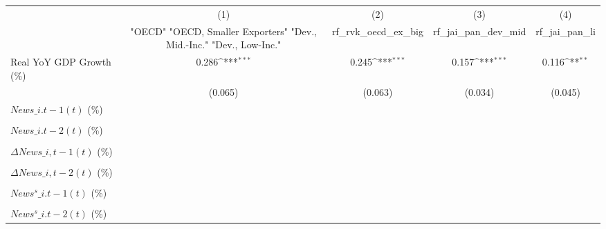 {
\def\sym#1{\ifmmode^{#1}\else\(^{#1}\)\fi}
\begin{tabular}{l*{4}{c}}
\toprule
                    &\multicolumn{1}{c}{(1)}&\multicolumn{1}{c}{(2)}&\multicolumn{1}{c}{(3)}&\multicolumn{1}{c}{(4)}\\
                    &\multicolumn{1}{c}{ "OECD" "OECD, Smaller Exporters" "Dev., Mid.-Inc." "Dev., Low-Inc."}&\multicolumn{1}{c}{rf\_rvk\_oecd\_ex\_big}&\multicolumn{1}{c}{rf\_jai\_pan\_dev\_mid}&\multicolumn{1}{c}{rf\_jai\_pan\_li}\\
\midrule
Real YoY GDP Growth (\%)&       0.286\sym{***}&       0.245\sym{***}&       0.157\sym{***}&       0.116\sym{**} \\
                    &     (0.065)         &     (0.063)         &     (0.034)         &     (0.045)         \\
\addlinespace
$ News\_{i.t-1}(t)$ (\%)&                     &                     &                     &                     \\
                    &                     &                     &                     &                     \\
\addlinespace
$ News\_{i.t-2}(t)$ (\%)&                     &                     &                     &                     \\
                    &                     &                     &                     &                     \\
\addlinespace
$ \Delta News\_{i,t-1}(t)$ (\%)&                     &                     &                     &                     \\
                    &                     &                     &                     &                     \\
\addlinespace
$ \Delta News\_{i,t-2}(t)$ (\%)&                     &                     &                     &                     \\
                    &                     &                     &                     &                     \\
\addlinespace
$ News^s\_{i.t-1}(t)$ (\%)&                     &                     &                     &                     \\
                    &                     &                     &                     &                     \\
\addlinespace
$ News^s\_{i.t-2}(t)$ (\%)&                     &                     &                     &                     \\

\end{tabular}}
